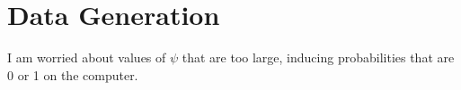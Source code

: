 \documentclass{article}
\begin{document}
\section{Data Generation}

I am worried about values of $\psi$ that are too large, inducing probabilities
that are 0 or 1 on the computer.

{}

\end{document}
